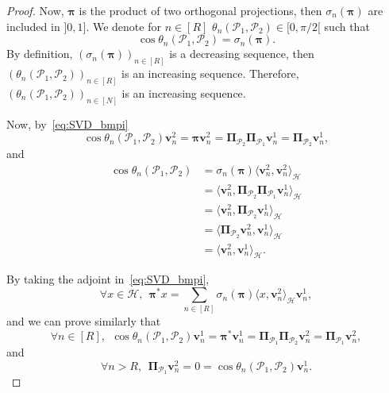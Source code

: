 \documentclass[twoside,11pt]{book}
\numberwithin{theorem}{chapter}
\numberwithin{definition}{chapter}
\numberwithin{proposition}{chapter}
\numberwithin{corollary}{chapter}
\numberwithin{example}{chapter}
\numberwithin{lemma}{chapter}
\numberwithin{assumption}{chapter}
\begin{document}
\begin{proof}

Now, $\bm{\pi}$ is the product of two orthogonal projections, then $\sigma_{n}(\bm{\pi})$ are included in $]0,1]$. We denote for $n \in [R]$ $\theta_{n}(\mathcal{P}_1,\mathcal{P}_2) \in [0,\pi/2[$ such that
\begin{equation}
\cos \theta_n(\mathcal{P}_1,\mathcal{P}_2) = \sigma_{n}(\bm{\pi}).
\end{equation}
By definition, $(\sigma_{n}(\bm{\pi}))_{n \in [R]}$ is a decreasing sequence, then $(\theta_{n}(\mathcal{P}_1,\mathcal{P}_2))_{n \in [R]}$ is an increasing sequence. Therefore, $(\theta_{n}(\mathcal{P}_1,\mathcal{P}_2))_{n \in [N]}$
is an increasing sequence.

Now, by~\eqref{eq:SVD_bmpi}
\begin{equation}
\cos \theta_n(\mathcal{P}_1,\mathcal{P}_2) \bm{v}^{2}_{n} = \bm{\pi} \bm{v}^{2}_{n} = \bm{\Pi}_{\mathcal{P}_{2}} \bm{\Pi}_{\mathcal{P}_{1}} \bm{v}^{1}_{n} = \bm{\Pi}_{\mathcal{P}_{2}} \bm{v}^{1}_{n},
\end{equation}
and
\begin{align}
\cos \theta_n(\mathcal{P}_1,\mathcal{P}_2) & = \sigma_n(\bm{\pi}) \langle \bm{v}^{2}_{n}, \bm{v}^{2}_{n} \rangle_{\mathcal{H}} \nonumber \\
& = \langle \bm{v}^{2}_{n},\bm{\Pi}_{\mathcal{P}_2} \bm{\Pi}_{\mathcal{P}_1} \bm{v}^{1}_{n}\rangle_{\mathcal{H}} \nonumber \\
& = \langle \bm{v}^{2}_{n}, \bm{\Pi}_{\mathcal{P}_2} \bm{v}^{1}_{n} \rangle_{\mathcal{H}} \nonumber \\
& = \langle \bm{\Pi}_{\mathcal{P}_2} \bm{v}^{2}_{n},  \bm{v}^{1}_{n} \rangle_{\mathcal{H}} \nonumber \\
& = \langle \bm{v}^{2}_{n},  \bm{v}^{1}_{n} \rangle_{\mathcal{H}}.
\end{align}

By taking the adjoint in~\eqref{eq:SVD_bmpi}, 
\begin{equation}
\forall x \in \mathcal{H}, \:\: \bm{\pi}^{*} x = \sum\limits_{n \in [R]} \sigma_{n}(\bm{\pi}) \langle x,\bm{v}^{2}_{n} \rangle_{\mathcal{H}} \bm{v}^{1}_{n},
\end{equation}
and we can prove similarly that
\begin{equation}
\forall n \in [R], \:\:\cos \theta_n(\mathcal{P}_1,\mathcal{P}_2) \bm{v}^{1}_{n} = \bm{\pi}^{*} \bm{v}^{1}_{n} = \bm{\Pi}_{\mathcal{P}_{1}} \bm{\Pi}_{\mathcal{P}_{2}} \bm{v}^{2}_{n} = \bm{\Pi}_{\mathcal{P}_{1}} \bm{v}^{2}_{n},
\end{equation}
and
\begin{equation}
\forall n >R, \:\:\bm{\Pi}_{\mathcal{P}_{1}} \bm{v}^{2}_{n} = 0 = \cos \theta_{n}(\mathcal{P}_1,\mathcal{P}_2) \bm{v}^{1}_{n}.
\end{equation}


\end{proof}
\end{document}
